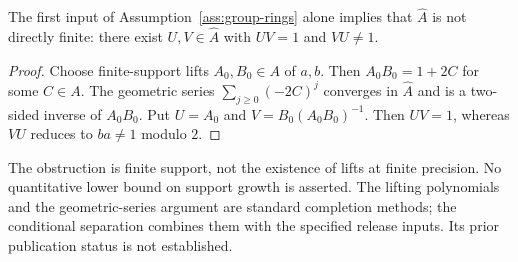 \begin{proposition}
\label{prop:adic-direct-finiteness}
The first input of Assumption~\ref{ass:group-rings} alone implies that
$\widehat A$ is not directly finite: there exist $U,V\in\widehat A$
with $UV=1$ and $VU\neq1$.
\end{proposition}

\begin{proof}
Choose finite-support lifts $A_0,B_0\in A$ of $a,b$.  Then
$A_0B_0=1+2C$ for some $C\in A$.  The geometric series
$\sum_{j\geq0}(-2C)^j$ converges in $\widehat A$ and is a two-sided
inverse of $A_0B_0$.  Put
$U=A_0$ and $V=B_0(A_0B_0)^{-1}$.  Then $UV=1$, whereas
$VU$ reduces to $ba\neq1$ modulo $2$.
\end{proof}

\begin{remark}
The obstruction is finite support, not the existence of lifts at finite
precision.  No quantitative lower bound on support growth is asserted.
The lifting polynomials and the geometric-series argument are standard
completion methods; the conditional separation combines them with the
specified release inputs.  Its prior publication status is not established.
\end{remark}
